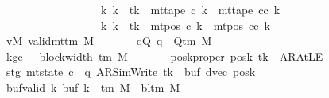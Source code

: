 \begin{isabellebody}
\ \ \ \ \ \ \ \ \ \ \ \ \ \ \ \ \ \ \ \ \ \ \ {\isasymand}\ {\isacharparenleft}{\kern0pt}{\isasymforall}k{\isacharprime}{\kern0pt}{\isachardot}{\kern0pt}\ k{\isacharprime}{\kern0pt}\ {\isasymnoteq}\ tk\ {\isasymlongrightarrow}\ mt{\isacharunderscore}{\kern0pt}tape\ c{}\ k{\isacharprime}{\kern0pt}\ {\isacharequal}{\kern0pt}\ mt{\isacharunderscore}{\kern0pt}tape\ cc\ k{\isacharprime}{\kern0pt}{\isacharparenright}{\kern0pt}\isanewline
\ \ \ \ \ \ \ \ \ \ \ \ \ \ \ \ \ \ \ \ \ \ \ {\isasymand}\ {\isacharparenleft}{\kern0pt}{\isasymforall}k{\isacharprime}{\kern0pt}{\isachardot}{\kern0pt}\ k{\isacharprime}{\kern0pt}\ {\isasymnoteq}\ tk\ {\isasymlongrightarrow}\ mt{\isacharunderscore}{\kern0pt}pos\ c{}\ k{\isacharprime}{\kern0pt}\ {\isacharequal}{\kern0pt}\ mt{\isacharunderscore}{\kern0pt}pos\ cc\ k{\isacharprime}{\kern0pt}{\isacharparenright}{\kern0pt}{\isachardoublequoteclose}\isanewline
\ \ \ \ \ \ \ vM{\isacharcolon}{\kern0pt}\ {\isachardoublequoteopen}valid{\isacharunderscore}{\kern0pt}mttm\ M{\isachardoublequoteclose}\isanewline
\ \ \ \ \ \ \ qQ{\isacharcolon}{\kern0pt}\ {\isachardoublequoteopen}q\ {\isasymin}\ Q{\isacharunderscore}{\kern0pt}tm\ M{\isachardoublequoteclose}\isanewline
\ \ \ \ \ \ \ kge{}{\isacharcolon}{\kern0pt}\ {\isachardoublequoteopen}{}\ {\isasymle}\ block{\isacharunderscore}{\kern0pt}width\ {\isacharparenleft}{\kern0pt}{\isasymGamma}{\isacharunderscore}{\kern0pt}tm\ M{\isacharparenright}{\kern0pt}{\isachardoublequoteclose}\isanewline
\ \ \ \ \ \ \ poskproper{\isacharcolon}{\kern0pt}\ {\isachardoublequoteopen}posk\ tk\ {\isasymnoteq}\ AR{\isacharunderscore}{\kern0pt}AtLE{\isachardoublequoteclose}\isanewline
\ \ \ \ \ \ \ stg{\isacharcolon}{\kern0pt}\ {\isachardoublequoteopen}mt{\isacharunderscore}{\kern0pt}state\ c{\isacharprime}{\kern0pt}\ {\isacharequal}{\kern0pt}\ {\isacharparenleft}{\kern0pt}q{\isacharcomma}{\kern0pt}\ AR{\isacharunderscore}{\kern0pt}SimWrite{\isacharcomma}{\kern0pt}\ tk{\isacharcomma}{\kern0pt}\ {}{\isacharcomma}{\kern0pt}\ buf{\isacharcomma}{\kern0pt}\ dvec{\isacharcomma}{\kern0pt}\ posk{\isacharparenright}{\kern0pt}{\isachardoublequoteclose}\isanewline
\ \ \ \ \ \ \ buf{\isacharunderscore}{\kern0pt}valid{\isacharcolon}{\kern0pt}\ {\isachardoublequoteopen}{\isasymforall}k{\isachardot}{\kern0pt}\ buf\ k\ {\isasymin}\ {\isasymGamma}{\isacharunderscore}{\kern0pt}tm\ M\ {\isasymunion}\ {\isacharbraceleft}{\kern0pt}bl{\isacharunderscore}{\kern0pt}tm\ M{\isacharbraceright}{\kern0pt}{\isachardoublequoteclose}\isanewline

\end{isabellebody}
